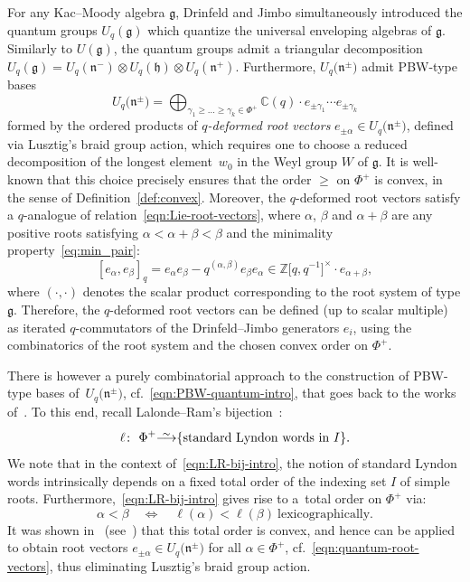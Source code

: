 \documentclass[pdftex]{sigma}
\numberwithin{equation}{section}
\newcommand{\fg}{\mathfrak{g}}
\newcommand{\fn}{\mathfrak{n}}
\newcommand{\fh}{\mathfrak{h}}
\newcommand{\BZ}{\mathbb{Z}}
\newcommand{\BC}{\mathbb{C}}
\newcommand\iso{ \vphantom{j^{X^2}}\smash{\overset{\sim}{\vphantom{\rule{0pt}{0.20em}}\smash{\longrightarrow}}} }
\begin{document}
For any Kac--Moody algebra $\fg$, Drinfeld and Jimbo simultaneously introduced the quantum groups $U_q(\fg)$ which quantize the universal enveloping algebras of $\fg$. Similarly to $U(\fg)$, the quantum groups admit a triangular decomposition $U_q(\fg) = U_q(\fn^-) \otimes U_q(\fh) \otimes U_q(\fn^+)$. Furthermore, $U_q\bigl(\fn^\pm\bigr)$ admit PBW-type bases
\begin{equation}\label{eqn:PBW-quantum-intro}
 U_q\bigl(\fn^\pm\bigr) =
 \bigoplus_{\gamma_1 \geq \dots \geq \gamma_k \in \Phi^+} \BC(q) \cdot e_{\pm \gamma_1} \cdots e_{\pm \gamma_k}
\end{equation}
formed by the ordered products of \textit{$q$-deformed root vectors} $e_{\pm \alpha} \in U_q\bigl(\fn^\pm\bigr)$, defined via Lusztig's braid group action, which requires one to choose a reduced decomposition of the longest element~$w_0$ in the Weyl group $W$ of $\fg$. It is well-known \cite{P} that this choice precisely ensures that the order $\geq$ on $\Phi^+$ is convex, in the sense of Definition~\ref{def:convex}. Moreover, the $q$-deformed root vectors satisfy a $q$-analogue of relation~\eqref{eqn:Lie-root-vectors}, where $\alpha$, $\beta$ and $\alpha+\beta$ are any positive roots satisfying $\alpha<\alpha+\beta<\beta$ and the minimality property~\eqref{eq:min_pair}:
\begin{equation}\label{eqn:quantum-root-vectors}
 [e_{\alpha} , e_{\beta}]_q = e_{\alpha} e_{\beta} - q^{(\alpha, \beta)} e_{\beta} e_{\alpha}
 \in \BZ\bigl[q,q^{-1}\bigr]^\times \cdot e_{\alpha+\beta},
\end{equation}
where $(\cdot, \cdot)$ denotes the scalar product corresponding to the root system of type $\fg$. Therefore, the $q$-deformed root vectors can be defined (up to scalar multiple) as iterated $q$-commutators of the Drinfeld--Jimbo generators $e_i$, using the combinatorics of the root system and the chosen convex order on $\Phi^+$.

There is however a purely combinatorial approach to the construction of PBW-type bases of~$U_q\bigl(\fn^\pm\bigr)$, cf.\ \eqref{eqn:PBW-quantum-intro}, that goes back to the works of~\cite{K1,K2,L,Ro}. To this end, recall Lalonde--Ram's bijection~\cite{LR}:
\begin{equation}\label{eqn:LR-bij-intro}
 \ell \colon\ \Phi^+ \iso \{\text{standard Lyndon words in}\ I\}.
\end{equation}
We note that in the context of~\eqref{eqn:LR-bij-intro}, the notion of standard Lyndon words intrinsically depends on a fixed total order of the indexing set $I$ of simple roots. Furthermore,~\eqref{eqn:LR-bij-intro} gives rise to a~total order on $\Phi^+$ via:
\begin{displaymath}
 \alpha < \beta \quad \Longleftrightarrow \quad \ell(\alpha) < \ell(\beta) \ \text{lexicographically}.
\end{displaymath}
It was shown in~\cite{Ro} (see~\cite[Proposition~26]{L}) that this total order is convex, and hence can be applied to obtain root vectors $e_{\pm \alpha} \in U_q\bigl(\fn^\pm\bigr)$ for all $\alpha\in \Phi^+$, cf.\ \eqref{eqn:quantum-root-vectors}, thus eliminating Lusztig's braid group action.
\end{document}
